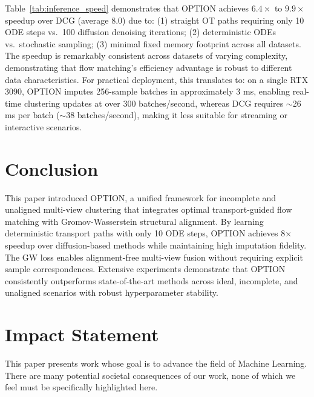 \documentclass{article}
\theoremstyle{plain}
\theoremstyle{definition}
\theoremstyle{remark}
\begin{document}
Table~\ref{tab:inference_speed} demonstrates that OPTION achieves $6.4\times$ to $9.9\times$ speedup over DCG (average 8.0\texttimes) due to: (1) straight OT paths requiring only 10 ODE steps vs.\ 100 diffusion denoising iterations; (2) deterministic ODEs vs.\ stochastic sampling; (3) minimal fixed memory footprint across all datasets. The speedup is remarkably consistent across datasets of varying complexity, demonstrating that flow matching's efficiency advantage is robust to different data characteristics. For practical deployment, this translates to: on a single RTX 3090, OPTION imputes 256-sample batches in approximately 3 ms, enabling real-time clustering updates at over 300 batches/second, whereas DCG requires $\sim$26 ms per batch ($\sim$38 batches/second), making it less suitable for streaming or interactive scenarios.

\section{Conclusion}\label{conclusion}

This paper introduced OPTION, a unified framework for incomplete and unaligned multi-view clustering that integrates optimal transport-guided flow matching with Gromov-Wasserstein structural alignment. By learning deterministic transport paths with only 10 ODE steps, OPTION achieves 8$\times$ speedup over diffusion-based methods while maintaining high imputation fidelity. The GW loss enables alignment-free multi-view fusion without requiring explicit sample correspondences. Extensive experiments demonstrate that OPTION consistently outperforms state-of-the-art methods across ideal, incomplete, and unaligned scenarios with robust hyperparameter stability.

\section*{Impact Statement}

This paper presents work whose goal is to advance the field of Machine Learning. There are many potential societal consequences of our work, none of which we feel must be specifically highlighted here.



\end{document}
